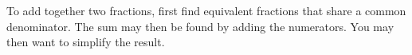To add together two fractions, first find equivalent fractions that
share a common denominator. The sum may then be found by adding the
numerators. You may then want to simplify the result.